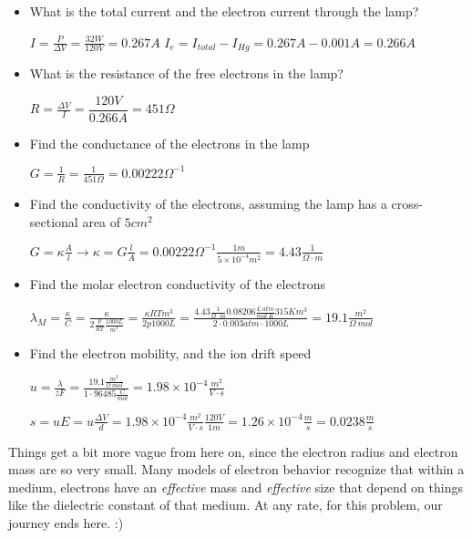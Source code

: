 \documentclass[11pt, letterpaper]{memoir}
\begin{document}
\begin{itemize}
	\item What is the total current and the electron current through the lamp?
	
	$I=\frac{P}{\Delta V} = \frac{32W}{120V}=0.267A$ \hspace{4em} $I_{e}=I_{total}-I_{Hg}=0.267A-0.001A = 0.266A$
	
	\item What is the resistance of the free electrons in the lamp?
	
	$R=\frac{\Delta V}{I} = \dfrac{120V}{0.266A}=451\Omega$
	
	\item Find the conductance of the electrons in the lamp
	
	$G=\frac{1}{R}=\frac{1}{451\Omega}=0.00222\Omega^{-1}$
	
	\item Find the conductivity of the electrons, assuming the lamp has a cross-sectional area of $5cm^2$
	
	$G=\kappa\frac{A}{l} \rightarrow \kappa=G\frac{l}{A}=0.00222\Omega^{-1}\frac{1m}{5\times10^{-4}m^2} = 4.43 \frac{1}{\Omega\cdot m}$
	
	\item Find the molar electron conductivity of the electrons
	
	$\lambda_M=\frac{\kappa}{C}=\frac{\kappa}{2\frac{p}{RT}\frac{1000L}{m^3}}=\frac{\kappa RTm^3}{2p1000L}=\frac{4.43 \frac{1}{\Omega\cdot m}0.08206\frac{L~atm}{mol~K}315Km^3}{2\cdot 0.003atm\cdot1000L}=19.1\frac{m^2}{\Omega~mol}$
	
	\item Find the electron mobility, and the ion drift speed
	
	$u = \frac{\lambda}{zF}=\frac{19.1\frac{m^2}{\Omega~mol}}{1\cdot 96485\frac{C}{mol}} = 1.98\times10^{-4}\frac{m^2}{V\cdot s}$
	
	$s=uE=u\frac{\Delta V}{d}=1.98\times10^{-4}\frac{m^2}{V\cdot s}\frac{120V}{1m}= 1.26\times10^{-4}\frac{m}{s}=0.0238\frac{m}{s}$
	
	
\end{itemize}
\noindent
Things get a bit more vague from here on, since the electron radius and electron mass are so very small. Many models of electron behavior recognize that within a medium, electrons have an \emph{effective} mass and \emph{effective} size that depend on things like the dielectric constant of that medium. At any rate, for this problem, our journey ends here. :)
\end{document}

